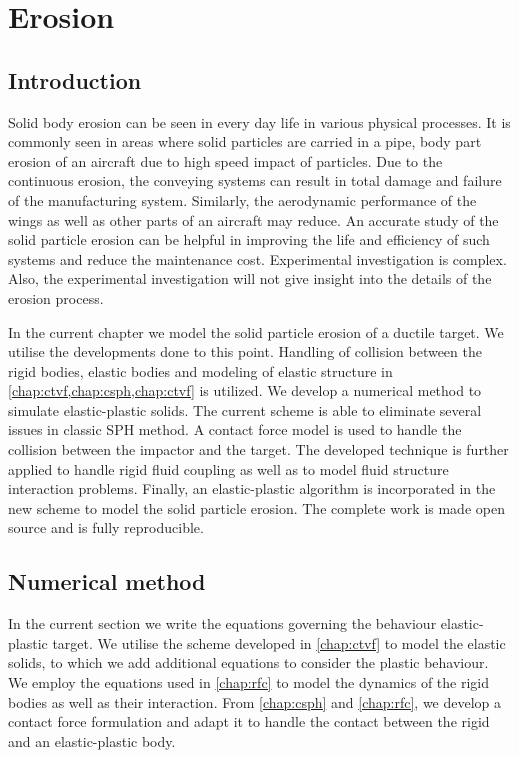 \chapter{Erosion}
\label{chap:erosion}

\section{Introduction}
\label{sec:intro}
Solid body erosion can be seen in every day life in various physical processes.
It is commonly seen in areas where solid particles are carried in a pipe, body
part erosion of an aircraft due to high speed impact of particles. Due to the
continuous erosion, the conveying systems can result in total damage and failure
of the manufacturing system. Similarly, the aerodynamic performance of the wings
as well as other parts of an aircraft may reduce. An accurate study of the solid
particle erosion can be helpful in improving the life and efficiency of such
systems and reduce the maintenance cost. Experimental investigation is complex.
Also, the experimental investigation will not give insight into the details of
the erosion process.


In the current chapter we model the solid particle erosion of a ductile target.
We utilise the developments done to this point. Handling of collision between
the rigid bodies, elastic bodies and modeling of elastic structure in
\cref{chap:ctvf,chap:csph,chap:ctvf} is utilized. We develop a numerical method
to simulate elastic-plastic solids. The current scheme is able to eliminate
several issues in classic SPH method. A contact force model is used to handle
the collision between the impactor and the target. The developed technique is
further applied to handle rigid fluid coupling as well as to model fluid
structure interaction problems. Finally, an elastic-plastic algorithm is
incorporated in the new scheme to model the solid particle erosion. The complete
work is made open source and is fully reproducible.



\FloatBarrier%
\section{Numerical method}
\label{sec:erosion-numerical-method}
In the current section we write the equations governing the behaviour
elastic-plastic target. We utilise the scheme developed in \cref{chap:ctvf} to
model the elastic solids, to which we add additional equations to consider the
plastic behaviour. We employ the equations used in \cref{chap:rfc} to model the
dynamics of the rigid bodies as well as their interaction. From \cref{chap:csph}
and \cref{chap:rfc}, we develop a contact force formulation and adapt it to
handle the contact between the rigid and an elastic-plastic body.

